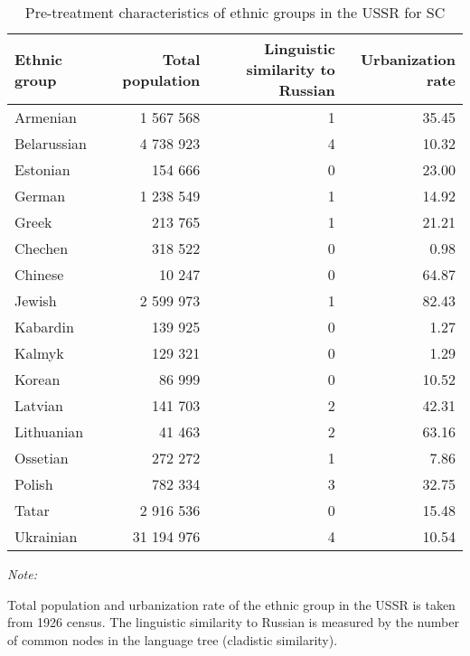 \begin{table}[t]

\caption{\label{tab:}Pre-treatment characteristics of ethnic groups in the USSR for SC}
\centering
\begin{threeparttable}
\begin{tabular}{lrrr}
\toprule
Ethnic group & Total population & Linguistic similarity to Russian & Urbanization rate\\
\midrule
Armenian & 1 567 568 & 1 & 35.45\\
Belarussian & 4 738 923 & 4 & 10.32\\
Estonian & 154 666 & 0 & 23.00\\
German & 1 238 549 & 1 & 14.92\\
Greek & 213 765 & 1 & 21.21\\
Chechen & 318 522 & 0 & 0.98\\
Chinese & 10 247 & 0 & 64.87\\
Jewish & 2 599 973 & 1 & 82.43\\
Kabardin & 139 925 & 0 & 1.27\\
Kalmyk & 129 321 & 0 & 1.29\\
Korean & 86 999 & 0 & 10.52\\
Latvian & 141 703 & 2 & 42.31\\
Lithuanian & 41 463 & 2 & 63.16\\
Ossetian & 272 272 & 1 & 7.86\\
Polish & 782 334 & 3 & 32.75\\
Tatar & 2 916 536 & 0 & 15.48\\
Ukrainian & 31 194 976 & 4 & 10.54\\
\bottomrule
\end{tabular}
\begin{tablenotes}
\item \textit{Note: } 
\item Total population and urbanization rate of the ethnic group in the USSR is taken from 1926 census. The linguistic similarity to Russian is measured by the number of common nodes in the language tree (cladistic similarity).
\end{tablenotes}
\end{threeparttable}
\end{table}